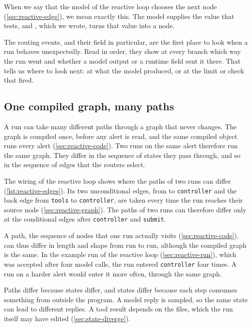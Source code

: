 When we say that the model of the reactive loop chooses the next node (\cref{sec:reactive-edge}),
we mean exactly this. The model supplies the value that  tests, and
, which we wrote, turns that value into a node.

The routing events, and their  field in particular, are the first place to look when a
run behaves unexpectedly. Read in order, they show at every branch which way the run went and
whether a model output or a runtime field sent it there. That tells us where to look next: at what
the model produced, or at the limit or check that fired.

\subsection{One compiled graph, many paths}
\label{sec:control-paths}

A run can take many different paths through a graph that never changes. The graph is compiled
once, before any alert is read, and the same compiled object runs every alert
(\cref{sec:reactive-code}). Two runs on the same alert therefore run the same graph. They differ in
the sequence of states they pass through, and so in the sequence of edges that the routers select.

The wiring of the reactive loop shows where the paths of two runs can differ
(\cref{lst:reactive-edges}). Its two unconditional edges, from  to
\texttt{controller} and the back edge from \texttt{tools} to \texttt{controller}, are taken every
time the run reaches their source node (\cref{sec:reactive-graph}). The paths of two runs can
therefore differ only at the conditional edges after \texttt{controller} and \texttt{submit}.

A path, the sequence of nodes that one run actually visits (\cref{sec:reactive-code}), can thus
differ in length and shape from run to run, although the compiled graph is the same. In the example
run of the reactive loop (\cref{sec:reactive-run}), which was accepted after four model calls, the run
entered \texttt{controller} four times. A run on a harder alert would enter it more often, through
the same graph.

Paths differ because states differ, and states differ because each step consumes something from
outside the program. A model reply is sampled, so the same state can lead to different replies. A
tool result depends on the files, which the run itself may have edited (\cref{sec:state-diverge}).

